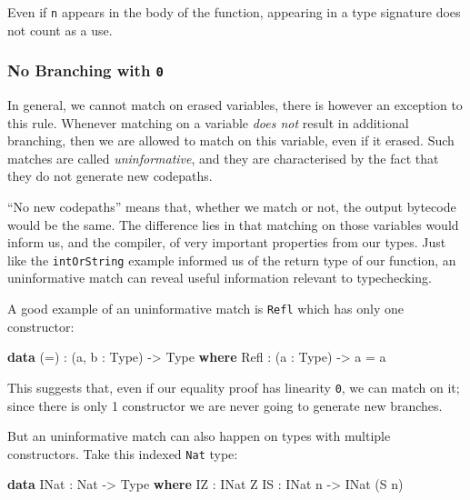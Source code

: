 \documentclass[
]{article}
\newenvironment{Shaded}{}{}
\newcommand{\DataTypeTok}[1]{\textcolor[rgb]{0.56,0.13,0.00}{#1}}
\newcommand{\KeywordTok}[1]{\textcolor[rgb]{0.00,0.44,0.13}{\textbf{#1}}}
\newcommand{\NormalTok}[1]{#1}
\newcommand{\OperatorTok}[1]{\textcolor[rgb]{0.40,0.40,0.40}{#1}}
\newcommand{\OtherTok}[1]{\textcolor[rgb]{0.00,0.44,0.13}{#1}}
\begin{document}
Even if \texttt{n} appears in the body of the function, appearing in a
type signature does not count as a use.

\hypertarget{no-branching-with-0}{%
\subsubsection{\texorpdfstring{No Branching with
\texttt{0}}{No Branching with 0}}\label{no-branching-with-0}}

In general, we cannot match on erased variables, there is however an
exception to this rule. Whenever matching on a variable \emph{does not}
result in additional branching, then we are allowed to match on this
variable, even if it erased. Such matches are called
\emph{uninformative}, and they are characterised by the fact that they
do not generate new codepaths.

``No new codepaths'' means that, whether we match or not, the output
bytecode would be the same. The difference lies in that matching on
those variables would inform us, and the compiler, of very important
properties from our types. Just like the \texttt{intOrString} example
informed us of the return type of our function, an uninformative match
can reveal useful information relevant to typechecking.

A good example of an uninformative match is \texttt{Refl} which has only
one constructor:

\begin{Shaded}
\begin{Highlighting}[]
\KeywordTok{data}\NormalTok{ (}\OtherTok{=}\NormalTok{) }\OperatorTok{:}\NormalTok{ (a, b }\OperatorTok{:} \DataTypeTok{Type}\NormalTok{) }\OtherTok{{-}\textgreater{}} \DataTypeTok{Type} \KeywordTok{where}
  \DataTypeTok{Refl} \OperatorTok{:}\NormalTok{ (a }\OperatorTok{:} \DataTypeTok{Type}\NormalTok{) }\OtherTok{{-}\textgreater{}}\NormalTok{ a }\OtherTok{=}\NormalTok{ a}
\end{Highlighting}
\end{Shaded}

This suggests that, even if our equality proof has linearity \texttt{0},
we can match on it; since there is only 1 constructor we are never going
to generate new branches.

But an uninformative match can also happen on types with multiple
constructors. Take this indexed \texttt{Nat} type:

\begin{Shaded}
\begin{Highlighting}[]
\KeywordTok{data} \DataTypeTok{INat} \OperatorTok{:} \DataTypeTok{Nat} \OtherTok{{-}\textgreater{}} \DataTypeTok{Type} \KeywordTok{where}
  \DataTypeTok{IZ} \OperatorTok{:} \DataTypeTok{INat} \DataTypeTok{Z}
  \DataTypeTok{IS} \OperatorTok{:} \DataTypeTok{INat}\NormalTok{ n }\OtherTok{{-}\textgreater{}} \DataTypeTok{INat}\NormalTok{ (}\DataTypeTok{S}\NormalTok{ n)}
\end{Highlighting}
\end{Shaded}
\end{document}
